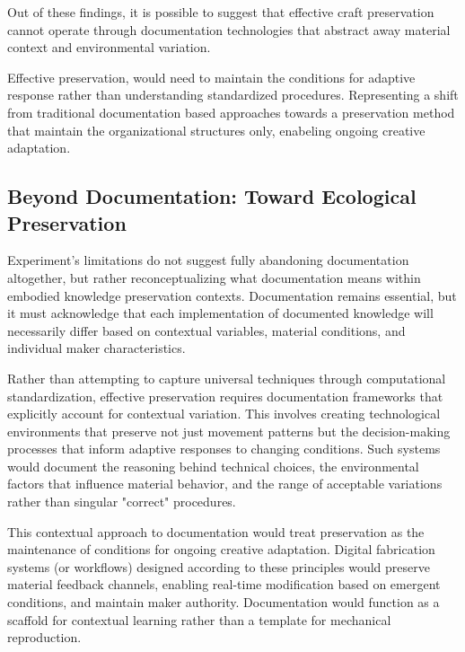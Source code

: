 \vspace{0.5cm}

Out of these findings, it is possible to suggest that effective craft preservation cannot operate through documentation technologies that abstract away material context and environmental variation.

\vspace{0.5cm}

Effective preservation, would need to maintain the conditions for adaptive response rather than understanding standardized procedures. Representing a shift from traditional documentation based approaches towards a preservation method that maintain the organizational structures only, enabeling ongoing creative adaptation.

\subsection{Beyond Documentation: Toward Ecological Preservation}

Experiment's limitations do not suggest fully abandoning documentation altogether, but rather reconceptualizing what documentation means within embodied knowledge preservation contexts. Documentation remains essential, but it must acknowledge that each implementation of documented knowledge will necessarily differ based on contextual variables, material conditions, and individual maker characteristics.

\vspace{0.5cm}

Rather than attempting to capture universal techniques through computational standardization, effective preservation requires documentation frameworks that explicitly account for contextual variation. This involves creating technological environments that preserve not just movement patterns but the decision-making processes that inform adaptive responses to changing conditions. Such systems would document the reasoning behind technical choices, the environmental factors that influence material behavior, and the range of acceptable variations rather than singular "correct" procedures.

\vspace{0.5cm}

This contextual approach to documentation would treat preservation as the maintenance of conditions for ongoing creative adaptation. Digital fabrication systems (or workflows) designed according to these principles would preserve material feedback channels, enabling real-time modification based on emergent conditions, and maintain maker authority. Documentation would function as a scaffold for contextual learning rather than a template for mechanical reproduction.

